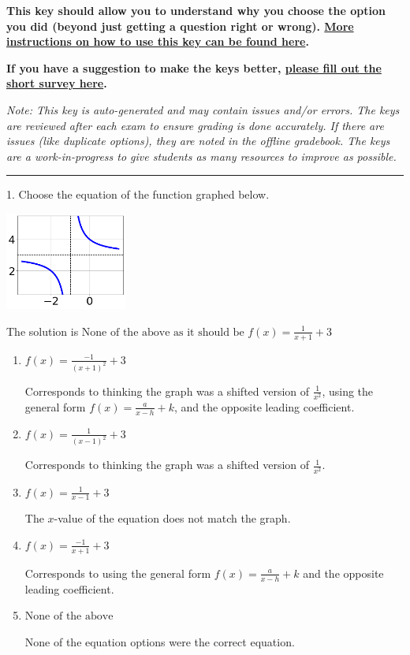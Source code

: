 \documentclass{extbook}[14pt]
\begin{document}
\textbf{This key should allow you to understand why you choose the option you did (beyond just getting a question right or wrong). \href{https://xronos.clas.ufl.edu/mac1105spring2020/courseDescriptionAndMisc/Exams/LearningFromResults}{More instructions on how to use this key can be found here}.}

\textbf{If you have a suggestion to make the keys better, \href{https://forms.gle/CZkbZmPbC9XALEE88}{please fill out the short survey here}.}

\textit{Note: This key is auto-generated and may contain issues and/or errors. The keys are reviewed after each exam to ensure grading is done accurately. If there are issues (like duplicate options), they are noted in the offline gradebook. The keys are a work-in-progress to give students as many resources to improve as possible.}

\rule{\textwidth}{0.4pt}

1. Choose the equation of the function graphed below.
\begin{center} \includegraphics[width=0.3\textwidth]{../Figures/rationalGraphToEquationA.png} \end{center} 

The solution is $ \text{None of the above as it should be } f(x) = \frac{1}{x + 1} + 3 $ 

\begin{enumerate}[label=\Alph*.] 
\item $ f(x) = \frac{-1}{(x + 1)^2} + 3 $ 

 Corresponds to thinking the graph was a shifted version of $\frac{1}{x^2}$, using the general form $f(x) = \frac{a}{x-h}+k$, and the opposite leading coefficient. 
\item $ f(x) = \frac{1}{(x - 1)^2} + 3 $ 

 Corresponds to thinking the graph was a shifted version of $\frac{1}{x^2}$. 
\item $ f(x) = \frac{1}{x - 1} + 3 $ 

 The $x$-value of the equation does not match the graph. 
\item $ f(x) = \frac{-1}{x + 1} + 3 $ 

 Corresponds to using the general form $f(x) = \frac{a}{x-h}+k$ and the opposite leading coefficient. 
\item $ \text{None of the above} $ 

 None of the equation options were the correct equation. 
\end{enumerate} 
 
\end{document}
